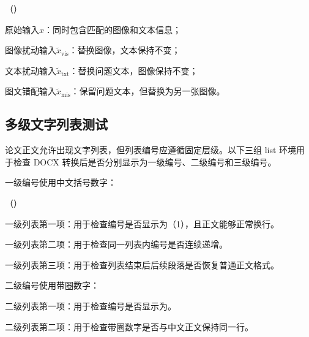 \begin{list}{（）}{
  \setlength{\leftmargin}{0pt}
  \settowidth{\labelwidth}{（1）}
  \setlength{\labelsep}{0pt}
  \setlength{\itemindent}{\dimexpr\parindent+\labelwidth\relax}
  \setlength{\itemsep}{\parskip}
  \setlength{\parsep}{0pt}
  \setlength{\topsep}{0pt}
  \setlength{\partopsep}{0pt}
}
\setlength{\parindent}{\originalparindent}
    \item 原始输入$x$：同时包含匹配的图像和文本信息；
    \item 图像扰动输入$\tilde{x}_{\mathrm{vis}}$：替换图像，文本保持不变；
    \item 文本扰动输入$\tilde{x}_{\mathrm{txt}}$：替换问题文本，图像保持不变；
    \item 图文错配输入$\tilde{x}_{\mathrm{mis}}$：保留问题文本，但替换为另一张图像。
\end{list}

\subsection{多级文字列表测试}
论文正文允许出现文字列表，但列表编号应遵循固定层级。以下三组 list 环境用于检查 DOCX 转换后是否分别显示为一级编号、二级编号和三级编号。

一级编号使用中文括号数字：
\begin{list}{（）}{
  \setlength{\leftmargin}{0pt}
  \settowidth{\labelwidth}{（1）}
  \setlength{\labelsep}{0pt}
  \setlength{\itemindent}{\dimexpr\parindent+\labelwidth\relax}
  \setlength{\itemsep}{\parskip}
  \setlength{\parsep}{0pt}
  \setlength{\topsep}{0pt}
  \setlength{\partopsep}{0pt}
}
\setlength{\parindent}{\originalparindent}
    \item 一级列表第一项：用于检查编号是否显示为（1），且正文能够正常换行。
    \item 一级列表第二项：用于检查同一列表内编号是否连续递增。
    \item 一级列表第三项：用于检查列表结束后后续段落是否恢复普通正文格式。
\end{list}

二级编号使用带圈数字：
\begin{list}{\circlednumber{\value{enumii}}}{
  \setlength{\leftmargin}{0pt}
  \setlength{\labelsep}{0pt}
  \setlength{\itemindent}{\dimexpr\parindent+\labelwidth\relax}
  \setlength{\itemsep}{\parskip}
  \setlength{\parsep}{0pt}
  \setlength{\topsep}{0pt}
  \setlength{\partopsep}{0pt}
}
\setlength{\parindent}{\originalparindent}
    \item 二级列表第一项：用于检查编号是否显示为。
    \item 二级列表第二项：用于检查带圈数字是否与中文正文保持同一行。
\end{list}

